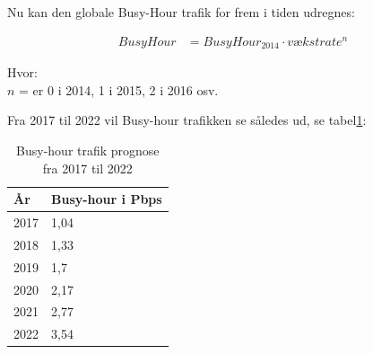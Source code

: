 Nu kan den globale Busy-Hour trafik for frem i tiden udregnes:

\begin{align}
	Busy Hour &= Busy Hour_{2014} \cdot vækstrate^n
\end{align}
\begin{tabbing}
Hvor:\\
	$ n $ = er 0 i 2014, 1 i 2015, 2 i 2016 osv.
\end{tabbing}
Fra 2017 til 2022 vil Busy-hour trafikken se således ud, se tabel\ref{tab:prognose}:
\begin{table}[!h]
    \begin{tabular}{|l|l|}
    \hline
    År   & Busy-hour i Pbps \\ \hline
    2017 & 1,04             \\ \hline
    2018 & 1,33             \\ \hline
    2019 & 1,7              \\ \hline
    2020 & 2,17             \\ \hline
    2021 & 2,77             \\ \hline
    2022 & 3,54             \\ \hline
    \end{tabular}
    \label{tab:prognose}
    \caption{Busy-hour trafik prognose fra 2017 til 2022}
\end{table}


